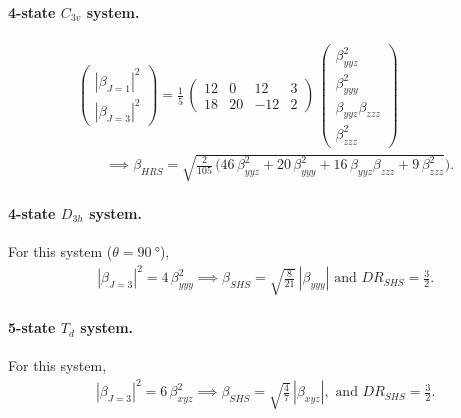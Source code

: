 \documentclass[journal=jpcafh]{achemso}
\begin{document}
\paragraph{4-state $C_{3v}$ system.} \begin{align}
	&\begin{pmatrix}
		|\beta_{J=1}|^2 \\ |\beta_{J=3}|^2
	\end{pmatrix} = \frac{1}{5}\,\begin{pmatrix}
		12 & 0 & 12 & 3 \\
		18 & 20 & -12 & 2
	\end{pmatrix}\,\begin{pmatrix}
		\beta_{yyz}^2\\\beta_{yyy}^2\\\beta_{yyz}\beta_{zzz} \\ \beta_{zzz}^2
	\end{pmatrix}\nonumber\\ &\hspace{2em}\implies \beta_{HRS} =\sqrt{\frac{2}{105}\,(46\,\beta_{yyz}^2+20\,\beta_{yyy}^2+16\,\beta_{yyz}\beta_{zzz} + 9\,\beta_{zzz}^2}).
\end{align}

\paragraph{4-state $D_{3h}$ system.} For this system ($\theta = \SI{90}{\degree}$),\begin{align}
	&|\beta_{J=3}|^2 = 4\,\beta_{yyy}^2 \implies \beta_{SHS} = \sqrt{\frac{8}{21}}\,|\beta_{yyy}| \text{ and } DR_{SHS} = \frac{3}{2}.
\end{align}

\paragraph{5-state $T_d$ system.}  For this system,\begin{align}
	&|\beta_{J=3}|^2 = 6\,\beta_{xyz}^2 \implies
	\beta_{SHS} = \sqrt{\frac{4}{7}}\,|\beta_{xyz}|, \text{ and } DR_{SHS}=\frac{3}{2}.
\end{align}


\end{document}
